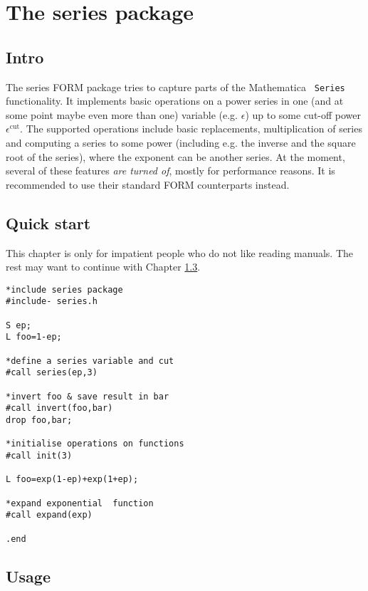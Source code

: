 \documentclass{article}
\begin{document}
\section{The series package}

\subsection{Intro}

The series FORM package tries to capture parts of the Mathematica {\tt
  Series} functionality. It implements basic operations on a power
series in one (and at some point maybe even more than one) variable
(e.g. $\epsilon$) up to some cut-off power $\epsilon^{\text{cut}}$. The
supported operations include basic replacements, multiplication of
series and computing a series to some power (including e.g. the inverse and
the square root of the series), where the exponent can be another
series. At the moment, several of these features {\em are turned of},
mostly for performance reasons. It is recommended to use their
standard FORM counterparts instead.

\subsection{Quick start}
\label{sec:quick}

This chapter is only for impatient people who do not like reading
manuals. The rest may want to continue with Chapter \ref{sec:usage}.

\begin{verbatim}
*include series package
#include- series.h

S ep;
L foo=1-ep;

*define a series variable and cut
#call series(ep,3)

*invert foo & save result in bar
#call invert(foo,bar)
drop foo,bar;

*initialise operations on functions
#call init(3)

L foo=exp(1-ep)+exp(1+ep);

*expand exponential  function
#call expand(exp)

.end
\end{verbatim}

\subsection{Usage}
\label{sec:usage}
\end{document}
